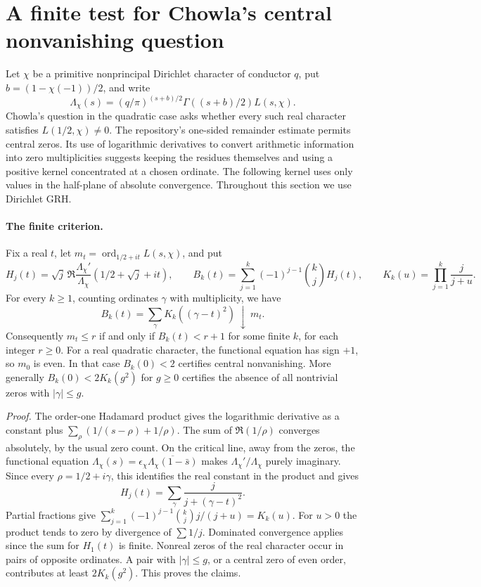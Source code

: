 \section{A finite test for Chowla's central nonvanishing question}

Let $\chi$ be a primitive nonprincipal Dirichlet character of conductor
$q$, put $b=(1-\chi(-1))/2$, and write
\[
 \Lambda_\chi(s)=(q/\pi)^{(s+b)/2}\Gamma((s+b)/2)L(s,\chi).
\]
Chowla's question in the quadratic case asks whether every such real
character satisfies $L(1/2,\chi)\ne0$. The repository's one-sided
remainder estimate permits central zeros. Its use of logarithmic derivatives
to convert arithmetic information into zero multiplicities suggests keeping
the residues themselves and using a positive kernel concentrated at a
chosen ordinate. The following kernel uses only values in the half-plane
of absolute convergence. Throughout this section we use Dirichlet GRH.

\paragraph{The finite criterion.}
Fix a real $t$, let $m_t=\operatorname{ord}_{1/2+it}L(s,\chi)$, and put
\[
 H_j(t)=\sqrt j\,\Re\frac{\Lambda_\chi'}{\Lambda_\chi}
       (1/2+\sqrt j+it),\qquad
 B_k(t)=\sum_{j=1}^k(-1)^{j-1}\binom{k}{j} H_j(t),\qquad
 K_k(u)=\prod_{j=1}^k\frac{j}{j+u}.
\]
For every $k\ge1$, counting ordinates $\gamma$ with multiplicity, we have
\begin{equation*}
 B_k(t)=\sum_\gamma K_k((\gamma-t)^2)\ \downarrow\ m_t.
\end{equation*}
Consequently $m_t\le r$ if and only if $B_k(t)<r+1$ for some finite $k$,
for each integer $r\ge0$. For a real quadratic character, the functional
equation has sign $+1$, so $m_0$ is even. In that case $B_k(0)<2$ certifies
central nonvanishing. More generally $B_k(0)<2K_k(g^2)$ for $g\ge0$
certifies the absence of all nontrivial zeros with $|\gamma|\le g$.

\emph{Proof.}
The order-one Hadamard product gives the logarithmic derivative as a
constant plus $\sum_\rho(1/(s-\rho)+1/\rho)$. The sum of
$\Re(1/\rho)$ converges absolutely, by the usual zero count. On the
critical line, away from the zeros, the functional equation
$\Lambda_\chi(s)=\epsilon_\chi\overline{\Lambda_\chi(1-\bar s)}$
makes $\Lambda_\chi'/\Lambda_\chi$ purely imaginary. Since every
$\rho=1/2+i\gamma$, this identifies the real constant in the product and gives
\[
 H_j(t)=\sum_\gamma\frac{j}{j+(\gamma-t)^2}.
\]
Partial fractions give
$\sum_{j=1}^k(-1)^{j-1}\binom{k}{j}j/(j+u)=K_k(u)$.
For $u>0$ the product tends to zero by divergence of $\sum 1/j$.
Dominated convergence applies since the sum for $H_1(t)$ is finite.
Nonreal zeros of the real character occur in pairs of opposite ordinates.
A pair with $|\gamma|\le g$, or a central zero of even order, contributes
at least $2K_k(g^2)$. This proves the claims.

